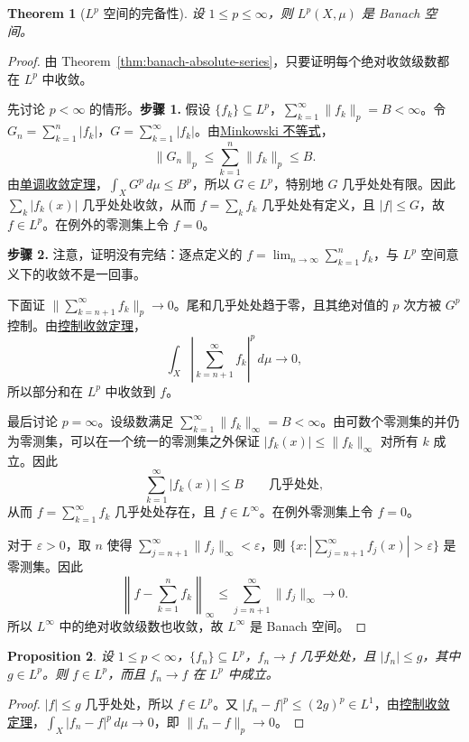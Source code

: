 \documentclass[12pt,letterpaper,twoside,openright]{ctexbook}
\theoremstyle{bluehead}
\newtheorem{theorem}{Theorem}
\newtheorem{proposition}[theorem]{Proposition}
\theoremstyle{olivehead}
\theoremstyle{orangehead}
\theoremstyle{redremark}
\begin{document}
\begin{theorem}[\texorpdfstring{$L^p$}{Lp} 空间的完备性]
设 $1\leq p\leq\infty$，则 $L^p(X,\mu)$ 是 Banach 空间。
\end{theorem}

\begin{proof}
由 Theorem~\ref{thm:banach-absolute-series}，只要证明每个绝对收敛级数都在 $L^p$ 中收敛。

先讨论 $p<\infty$ 的情形。\textbf{步骤 1.} 假设 $\{f_k\}\subseteq L^p$，$\sum_{k=1}^{\infty}\|f_k\|_p=B<\infty$。令 $G_n=\sum_{k=1}^n|f_k|$，$G=\sum_{k=1}^{\infty}|f_k|$。由\hyperref[thm:minkowski-lp]{Minkowski 不等式}，
\[
\|G_n\|_p\leq\sum_{k=1}^n\|f_k\|_p\leq B.
\]
由\hyperref[thm:monotone-convergence]{单调收敛定理}，$\int_XG^p\,d\mu\leq B^p$，所以 $G\in L^p$，特别地 $G$ 几乎处处有限。因此 $\sum_k|f_k(x)|$ 几乎处处收敛，从而 $f=\sum_kf_k$ 几乎处处有定义，且 $|f|\leq G$，故 $f\in L^p$。在例外的零测集上令 $f=0$。

\textbf{步骤 2.} 注意，证明没有完结：逐点定义的 $f=\lim_{n\to\infty}\sum_{k=1}^nf_k$，与 $L^p$ 空间意义下的收敛不是一回事。

下面证 $\|\sum_{k=n+1}^{\infty}f_k\|_p\to0$。尾和几乎处处趋于零，且其绝对值的 $p$ 次方被 $G^p$ 控制。由\hyperref[thm:dominated-convergence]{控制收敛定理}，
\[
\int_X\left|\sum_{k=n+1}^{\infty}f_k\right|^p\,d\mu\longrightarrow0,
\]
所以部分和在 $L^p$ 中收敛到 $f$。

最后讨论 $p=\infty$。设级数满足 $\sum_{k=1}^{\infty}\|f_k\|_\infty=B<\infty$。由可数个零测集的并仍为零测集，可以在一个统一的零测集之外保证 $|f_k(x)|\leq\|f_k\|_\infty$ 对所有 $k$ 成立。因此
\[
\sum_{k=1}^{\infty}|f_k(x)|\leq B\qquad\text{几乎处处},
\]
从而 $f=\sum_{k=1}^{\infty}f_k$ 几乎处处存在，且 $f\in L^\infty$。在例外零测集上令 $f=0$。

对于 $\varepsilon>0$，取 $n$ 使得 $\sum_{j=n+1}^{\infty}\|f_j\|_\infty<\varepsilon$，则 $\{x:|\sum_{j=n+1}^{\infty}f_j(x)|>\varepsilon\}$ 是零测集。因此
\[
\left\|f-\sum_{k=1}^nf_k\right\|_\infty
\leq\sum_{j=n+1}^{\infty}\|f_j\|_\infty\longrightarrow0.
\]
所以 $L^\infty$ 中的绝对收敛级数也收敛，故 $L^\infty$ 是 Banach 空间。
\end{proof}

\begin{proposition}\label{prop:lp-dominated-convergence}
设 $1\leq p<\infty$，$\{f_n\}\subseteq L^p$，$f_n\to f$ 几乎处处，且 $|f_n|\leq g$，其中 $g\in L^p$。则 $f\in L^p$，而且 $f_n\to f$ 在 $L^p$ 中成立。
\end{proposition}
\begin{proof}
$|f|\leq g$ 几乎处处，所以 $f\in L^p$。又 $|f_n-f|^p\leq(2g)^p\in L^1$，由\hyperref[thm:dominated-convergence]{控制收敛定理}，$\int_X|f_n-f|^p\,d\mu\to0$，即 $\|f_n-f\|_p\to0$。
\end{proof}
\end{document}
